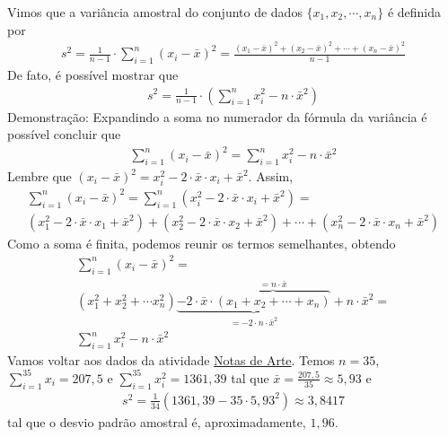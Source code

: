 {{{Vimos que a variância amostral do conjunto de dados \(\{x_1,x_2,\cdots,x_n\}\) é definida por
\begin{equation*}
\begin{split}s^2 = \frac{1}{n-1}\cdot \sum^n_{i=1} (x_i-\bar{x})^2=\frac{(x_1-\bar{x})^2+(x_2-\bar{x})^2+\cdots+(x_n-\bar{x})^2}{n-1}\end{split}
\end{equation*}
De fato, é possível mostrar que
\begin{equation*}
\begin{split}s^2 = \frac{1}{n-1}\cdot \left (\sum^n_{i=1} x^2_i-n\cdot \bar{x}^2\right )\end{split}
\end{equation*}
Demonstração:  Expandindo a soma no numerador da fórmula da variância é possível concluir que
\begin{equation*}
\begin{split}\sum^n_{i=1}(x_i-\bar{x})^2= \sum^n_{i=1} x^2_i -n\cdot \bar{x}^2\end{split}
\end{equation*}
Lembre que \((x_i-\bar{x})^2=x^2_i-2\cdot \bar{x}\cdot x_i+\bar{x}^2\). Assim,
\begin{equation*}
\begin{split} \sum^n_{i=1}(x_i-\bar{x})^2=\sum^n_{i=1}(x^2_i-2\cdot \bar{x}\cdot x_i+\bar{x}^2)=\\ (x^2_1-2\cdot\bar{x}\cdot x_1+\bar{x}^2)+(x^2_2-2\cdot\bar{x}\cdot x_2+\bar{x}^2)+ \cdots + (x^2_n-2\cdot\bar{x}\cdot x_n+\bar{x}^2)\end{split}
\end{equation*}
Como a soma é finita, podemos reunir os termos semelhantes, obtendo
\needspace{10em}
\begin{equation*}
\begin{split}\sum^n_{i=1}(x_i-\bar{x})^2= \\ (x^2_1+x^2_2+\cdots x^2_n)\underbrace{-2\cdot \bar{x}\cdot \overbrace{(x_1+x_2+\cdots+x_n)}^{=n\cdot \bar{x}}}_{=-2\cdot n\cdot \bar{x}^2}+n\cdot \bar{x}^2= \\ \sum^n_{i=1} x^2_i-n\cdot\bar{x}^2\end{split}
\end{equation*}
Vamos voltar aos dados da atividade \hyperref[\detokenize{PE104-0:ativ-notas-de-artes}]{Notas de Arte}. Temos \(n=35\), \(\displaystyle{\sum^{35}_{i=1}}x_i=207{,}5\) e \(\displaystyle{\sum^{35}_{i=1}}x^2_i=1361{,}39\)  tal que \(\bar{x}=\frac{207{,}5}{35}\approx 5{,}93\) e
\begin{equation*}
\begin{split}s^2=\frac{1}{34}\left ( 1361{,}39-35\cdot 5{,}93^2\right )\approx 3{,}8417\end{split}
\end{equation*}
tal que o desvio padrão amostral é, aproximadamente, $1{,}96$.

}}}
